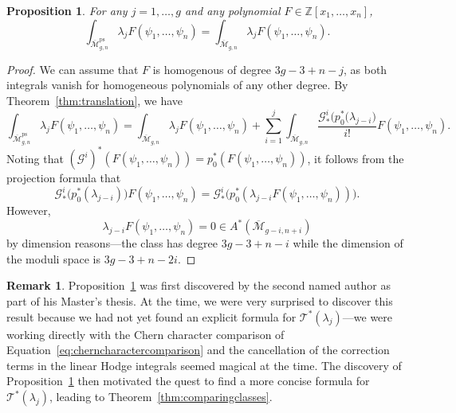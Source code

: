 \documentclass[12pt]{amsart}
\newtheorem{proposition}[equation]{Proposition}
\theoremstyle{definition}
\newtheorem{remark}[equation]{Remark}
\newcommand{\M}{\overline{\mathcal{M}}}
\newcommand{\ps}{\mathrm{ps}}
\newcommand{\T}{\mathcal{T}}
\newcommand{\G}{\mathcal{G}}
\newcommand{\Z}{\mathbb{Z}}
\numberwithin{equation}{section}
\begin{document}
\begin{proposition}\label{thm:linearhodge}
For any $j=1,\dots,g$ and any polynomial $F\in\Z[x_1,\dots,x_n]$,
\[
\int_{\M_{g,n}^\ps}\lambda_jF(\psi_1,\dots,\psi_n)=\int_{\M_{g,n}}\lambda_jF(\psi_1,\dots,\psi_n).
\]
\end{proposition}

\begin{proof}
We can assume that $F$ is homogenous of degree $3g-3+n-j$, as both integrals vanish for homogeneous polynomials of any other degree. By Theorem~\ref{thm:translation}, we have
\[
 \int_{\M_{g,n}^\ps}\lambda_jF(\psi_1,\dots,\psi_n)=\int_{\M_{g,n}}\lambda_jF(\psi_1,\dots,\psi_n)+\sum_{i=1}^j\int_{\M_{g,n}}\frac{\G^i_*\big(p_0^*(\lambda_{j-i}\big)}{i!}F(\psi_1,\dots,\psi_n).
\]
Noting that $(\G^i)^*(F(\psi_1,\dots,\psi_n))=p_0^*(F(\psi_1,\dots,\psi_n))$, it follows from the projection formula that 
\[
\G^i_*\big(p_0^*(\lambda_{j-i})\big)F(\psi_1,\dots,\psi_n)=\G^i_*\big(p_0^*(\lambda_{j-i}F(\psi_1,\dots,\psi_n))\big).
\]
However,
\[
\lambda_{j-i}F(\psi_1,\dots,\psi_n)=0\in A^*(\M_{g-i,n+i})
\]
by dimension reasons---the class has degree $3g-3+n-i$ while the dimension of the moduli space is $3g-3+n-2i$.
\end{proof}

\begin{remark}
Proposition~\ref{thm:linearhodge} was first discovered by the second named author as part of his Master's thesis. At the time, we were very surprised to discover this result because we had not yet found an explicit formula for $\T^*(\lambda_j)$---we were working directly with the Chern character comparison of Equation~\eqref{eq:cherncharactercomparison} and the cancellation of the correction terms in the linear Hodge integrals seemed magical at the time. The discovery of Proposition~\ref{thm:linearhodge} then motivated the quest to find a more concise formula for $\T^*(\lambda_j)$, leading to Theorem~\ref{thm:comparingclasses}.
\end{remark}
\end{document}
